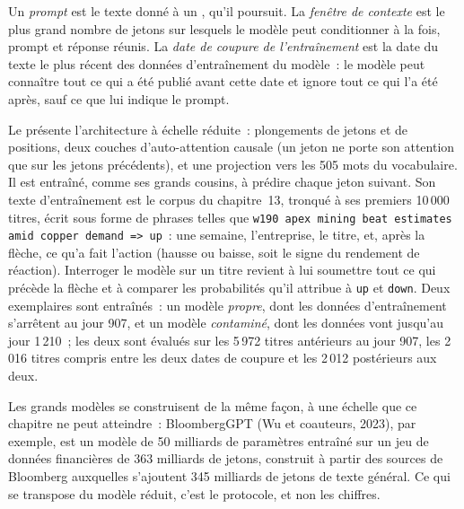 \begin{definition}\label{def:ml:large-language-models-in-finance:prompt}
Un \emph{prompt} est le texte donné à un , qu'il poursuit. La \emph{fenêtre de
contexte} est le plus grand nombre de jetons sur lesquels le modèle peut conditionner à la fois, prompt et réponse
réunis. La \emph{date de coupure de l'entraînement} est la date du texte le plus récent des données d'entraînement du modèle~:
le modèle peut connaître tout ce qui a été publié avant cette date et ignore tout ce qui l'a été après, sauf ce que lui indique le prompt.
\end{definition}

Le  présente l'architecture à échelle réduite~: plongements de jetons et de positions, deux couches
d'auto-attention causale (un jeton ne porte son attention que sur les jetons précédents), et une projection vers les 505 mots du vocabulaire. Il est
entraîné, comme ses grands cousins, à prédire chaque jeton suivant. Son texte d'entraînement est le corpus du chapitre~13, tronqué à ses premiers
10\,000 titres, écrit sous forme de phrases telles que \texttt{w190 apex mining beat estimates amid copper demand => up}~: une semaine,
l'entreprise, le titre, et, après la flèche, ce qu'a fait l'action (hausse ou baisse, soit le signe du rendement de réaction). Interroger le
modèle sur un titre revient à lui soumettre tout ce qui précède la flèche et à comparer les probabilités qu'il attribue à
\texttt{up} et \texttt{down}. Deux exemplaires sont entraînés~: un modèle \emph{propre}, dont les données d'entraînement s'arrêtent au jour 907, et un
modèle \emph{contaminé}, dont les données vont jusqu'au jour 1\,210~; les deux sont évalués sur les 5\,972 titres antérieurs au jour 907, les 2\,016
titres compris entre les deux dates de coupure et les 2\,012 postérieurs aux deux.

Les grands modèles se construisent de la même façon, à une échelle que ce chapitre ne peut atteindre~: BloombergGPT (Wu et coauteurs, 2023), par
exemple, est un modèle de 50 milliards de paramètres entraîné sur un jeu de données financières de 363 milliards de jetons, construit à partir des sources de Bloomberg
auxquelles s'ajoutent 345 milliards de jetons de texte général. Ce qui se transpose du modèle réduit, c'est le protocole, et non les chiffres.

